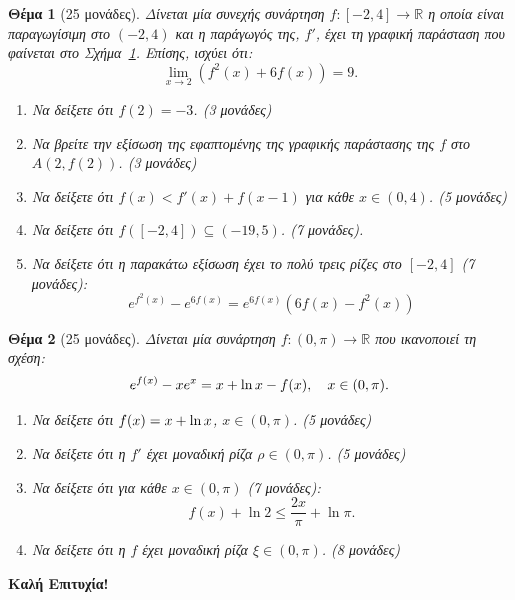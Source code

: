 \documentclass[11pt,a4paper]{article}
\newcommand{\R}{{\mathbb{R}}}
\newcommand{\pn}[1]{\left({#1}\right)}
\let\sin\relax
\DeclareMathOperator{\sin}{\text{ημ}}
\theoremstyle{myStyle}
\newtheorem{them}{Θέμα}
\begin{document}
	\begin{them}[25 μονάδες]
		\begin{minipage}{0.48\textwidth}
			Δίνεται μία συνεχής συνάρτηση $f:[-2,4]\to\R$ η οποία είναι παραγωγίσιμη στο $(-2,4)$ και η παράγωγός της, $f'$, έχει τη γραφική παράσταση που φαίνεται στο Σχήμα~\ref{fig:derivative}. Επίσης, ισχύει ότι:
			\[\lim_{x\to2}\pn{f^2(x)+6f(x)}=9.\]
			\begin{enumerate}
				\item Να δείξετε ότι $f(2)=-3$. (3 μονάδες)
				\item Να βρείτε την εξίσωση της εφαπτομένης της γραφικής παράστασης της $f$ στο $A(2,f(2))$. (3 μονάδες)
				\item Να δείξετε ότι $f(x)<f'(x)+f(x-1)$ για κάθε $x\in(0,4)$. (5 μονάδες)
				\item Να δείξετε ότι $f([-2,4])\subseteq(-19,5)$. (7 μονάδες).
				\item Να δείξετε ότι η παρακάτω εξίσωση έχει το πολύ τρεις ρίζες στο $[-2,4]$ (7 μονάδες):
				\[e^{f^2(x)}-e^{6f(x)}=e^{6f(x)}\pn{6f(x)-f^2(x)}\]
			\end{enumerate}
		\end{minipage}
		\hfill%
		\begin{minipage}{0.5\textwidth}
			\centering
			\label{fig:derivative}
		\end{minipage}
	\end{them}
	
	\begin{them}[25 μονάδες]
		Δίνεται μία συνάρτηση $f:(0,\pi)\to\R$ που ικανοποιεί τη σχέση:
		\[e^{f(x)}-xe^{\sin x}=\sin x+\ln x-f(x),\quad x\in(0,\pi).\]
		\begin{enumerate}
			\item Να δείξετε ότι $f(x)=\sin x+\ln x$, $x\in(0,\pi)$. (5 μονάδες)
			\item Να δείξετε ότι η $f'$ έχει μοναδική ρίζα $\rho\in(0,\pi)$. (5 μονάδες)
			\item Να δείξετε ότι για κάθε $x\in(0,\pi)$ (7 μονάδες):
			\[f(x)+\ln2\leq \frac{2x}{\pi}+\ln\pi.\]
			\item Να δείξετε ότι η $f$ έχει μοναδική ρίζα $\xi\in(0,\pi)$. (8 μονάδες)
		\end{enumerate}
	\end{them}
	\vfill
	\centering
	\textbf{Καλή Επιτυχία!}
\end{document}
